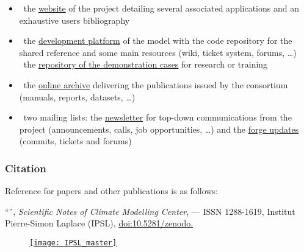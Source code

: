 \begin{itemize}
   \item \faWordpress\ the \href{http://www.nemo-ocean.eu}{website} of the project detailing
      several associated applications and an exhaustive users bibliography
   \item \faCodeFork\ the \href{http://forge.ipsl.jussieu.fr/nemo}{development platform} of
      the model with the code repository for the shared reference and some main resources
      (wiki, ticket system, forums, \ldots) \\
      \faGithub\ the \href{http://github.com/NEMO-ocean/NEMO-examples}
      {repository of the demonstration cases} for research or training
   \item \faCloudDownload\ the \href{http://zenodo.org/communities/nemo-ocean}{online archive}
      delivering the publications issued by the consortium (manuals, reports, datasets, \ldots)
   \item \faEnvelope\ two mailing lists:
      the \href{http://listes.ipsl.fr/sympa/info/nemo-newsletter}{newsletter} for
      top-down communications from the project (announcements, calls, job opportunities, \ldots)
      and the \href{http://listes.ipsl.fr/sympa/info/nemo-forge}{forge updates}
      (commits, tickets and forums)
\end{itemize}


\subsubsection*{Citation}

Reference for papers and other publications is as follows:

\medskip

\begin{sloppypar}
   ``{\bfseries \hdg}\ifdef{\shdg}{ -- \shdg}{}'',
   {\em Scientific Notes of Climate Modelling Center}, \textbf{\ipsl} --- ISSN 1288-1619,
   Institut Pierre-Simon Laplace (IPSL),
   \href{https://doi.org/10.5281/zenodo.\zid}{doi:10.5281/zenodo.\zid}
\end{sloppypar}

\begin{figure}[b]

   \begin{minipage}[c]{0.7\textwidth}
      \small
   \end{minipage}
   \hfill %
   \begin{minipage}[c]{0.25\textwidth}
      \href{http://www.cmc.ipsl.fr}{\texttt{[image: IPSL\_master]}}
   \end{minipage}

\end{figure}
